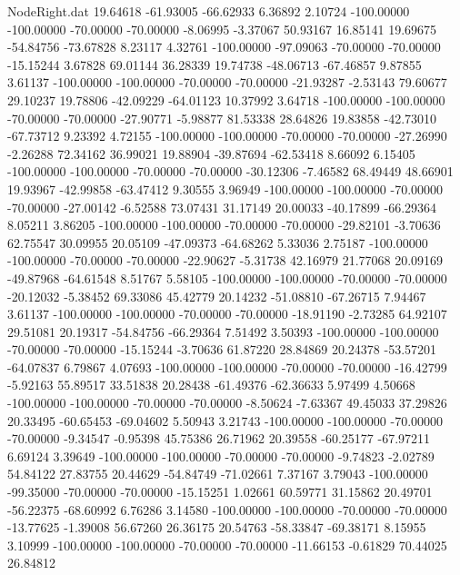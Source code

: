 \begin{filecontents}{NodeRight.dat}
  19.64618  -61.93005  -66.62933     6.36892    2.10724 -100.00000 -100.00000  -70.00000  -70.00000   -8.06995   -3.37067   50.93167   16.85141
  19.69675  -54.84756  -73.67828     8.23117    4.32761 -100.00000  -97.09063  -70.00000  -70.00000  -15.15244    3.67828   69.01144   36.28339
  19.74738  -48.06713  -67.46857     9.87855    3.61137 -100.00000 -100.00000  -70.00000  -70.00000  -21.93287   -2.53143   79.60677   29.10237
  19.78806  -42.09229  -64.01123    10.37992    3.64718 -100.00000 -100.00000  -70.00000  -70.00000  -27.90771   -5.98877   81.53338   28.64826
  19.83858  -42.73010  -67.73712     9.23392    4.72155 -100.00000 -100.00000  -70.00000  -70.00000  -27.26990   -2.26288   72.34162   36.99021
  19.88904  -39.87694  -62.53418     8.66092    6.15405 -100.00000 -100.00000  -70.00000  -70.00000  -30.12306   -7.46582   68.49449   48.66901
  19.93967  -42.99858  -63.47412     9.30555    3.96949 -100.00000 -100.00000  -70.00000  -70.00000  -27.00142   -6.52588   73.07431   31.17149
  20.00033  -40.17899  -66.29364     8.05211    3.86205 -100.00000 -100.00000  -70.00000  -70.00000  -29.82101   -3.70636   62.75547   30.09955
  20.05109  -47.09373  -64.68262     5.33036    2.75187 -100.00000 -100.00000  -70.00000  -70.00000  -22.90627   -5.31738   42.16979   21.77068
  20.09169  -49.87968  -64.61548     8.51767    5.58105 -100.00000 -100.00000  -70.00000  -70.00000  -20.12032   -5.38452   69.33086   45.42779
  20.14232  -51.08810  -67.26715     7.94467    3.61137 -100.00000 -100.00000  -70.00000  -70.00000  -18.91190   -2.73285   64.92107   29.51081
  20.19317  -54.84756  -66.29364     7.51492    3.50393 -100.00000 -100.00000  -70.00000  -70.00000  -15.15244   -3.70636   61.87220   28.84869
  20.24378  -53.57201  -64.07837     6.79867    4.07693 -100.00000 -100.00000  -70.00000  -70.00000  -16.42799   -5.92163   55.89517   33.51838
  20.28438  -61.49376  -62.36633     5.97499    4.50668 -100.00000 -100.00000  -70.00000  -70.00000   -8.50624   -7.63367   49.45033   37.29826
  20.33495  -60.65453  -69.04602     5.50943    3.21743 -100.00000 -100.00000  -70.00000  -70.00000   -9.34547   -0.95398   45.75386   26.71962
  20.39558  -60.25177  -67.97211     6.69124    3.39649 -100.00000 -100.00000  -70.00000  -70.00000   -9.74823   -2.02789   54.84122   27.83755
  20.44629  -54.84749  -71.02661     7.37167    3.79043 -100.00000  -99.35000  -70.00000  -70.00000  -15.15251    1.02661   60.59771   31.15862
  20.49701  -56.22375  -68.60992     6.76286    3.14580 -100.00000 -100.00000  -70.00000  -70.00000  -13.77625   -1.39008   56.67260   26.36175
  20.54763  -58.33847  -69.38171     8.15955    3.10999 -100.00000 -100.00000  -70.00000  -70.00000  -11.66153   -0.61829   70.44025   26.84812

\end{filecontents}
